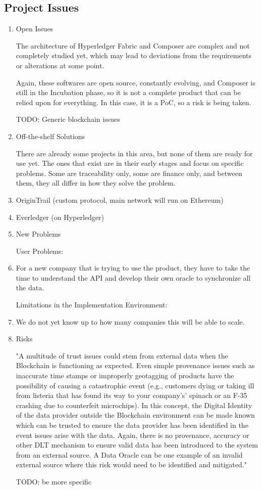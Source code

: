 \subsection{Project Issues}
\begin{enumerate}
	\item Open Issues
		\par The architecture of Hyperledger Fabric and Composer are complex and not completely studied yet, which may lead to deviations from the requirements or alterations at some point.
		\par Again, these softwares are open source, constantly evolving, and Composer is still in the Incubation phase, so it is not a complete product that can be relied upon for everything. In this 
		case, it is a PoC, so a risk is being taken.
		\par TODO: Generic blockchain issues
	
    \item Off-the-shelf Solutions
		\par There are already some projects in this area, but none of them are ready for use yet. The ones that exist are in their early stages and focus on specific problems. Some are traceability only, some are finance only, and between them, they all differ in how they solve the problem.
			\item OriginTrail (custom protocol, main network will run on Ethereum)
			\item Everledger (on Hyperledger)
			
    \item New Problems
		\par User Problems: 
			\item For a new company that is trying to use the product, they have to take the time to understand the API and develop their own oracle to synchronize all the data. 
		\par Limitations in the Implementation Environment:
			\item We do not yet know up to how many companies this will be able to scale.
		
    \item Risks
		\par "A multitude of trust issues could stem from external data when the Blockchain is functioning as expected. Even simple provenance issues such as inaccurate time stamps or improperly geotagging of products have the possibility of causing a catastrophic event (e.g., customers dying or taking ill from listeria that has found its way to your company's’ spinach or an F-35 crashing due to counterfeit microchips). In this concept, the Digital Identity of the data provider outside the Blockchain environment can be made known which can be trusted to ensure the data provider has been identified in the event issues arise with the data. Again, there is no provenance, accuracy or other DLT mechanism to ensure valid data has been introduced to the system from an external source. A Data Oracle can be one example of an invalid external source where this risk would need to be identified and mitigated."
		\par TODO: be more specific
		

\end{enumerate}
